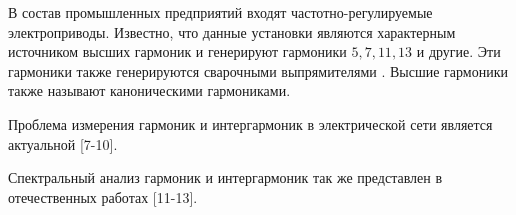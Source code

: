 В состав промышленных предприятий входят частотно-регулируемые электроприводы. Известно, что данные установки являются характерным источником высших гармоник и генерируют гармоники $5,7,11,13$ и другие. Эти гармоники также генерируются сварочными выпрямителями \cite{Calculation_Current_Mikheev_2017}. Высшие гармоники также называют каноническими гармониками.

Проблема измерения гармоник и интергармоник в электрической сети является актуальной [7-10]. \cite{testa2007интергармоники, gunther2001interharmonics, 532851,testa2002interharmonic}

 
Спектральный анализ гармоник и интергармоник так же представлен в отечественных работах [11-13]. \cite{Improving_methods_Shizma_2014,Harmonic_analysis_Goldstein2009, Development_method_Osipov_2017}



